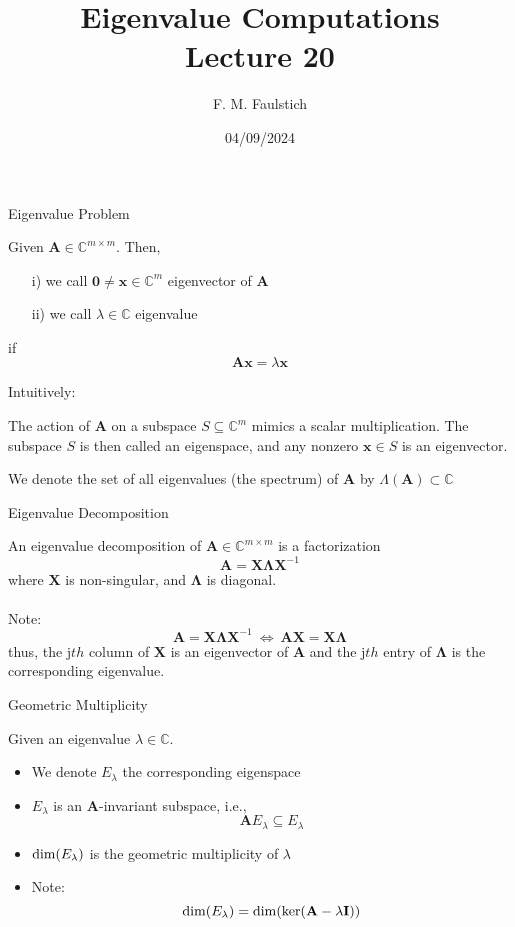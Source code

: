 \documentclass{beamer}
\title{
Eigenvalue Computations\\
Lecture 20
}
\author{F. M. Faulstich}
\date{04/09/2024}
\newcommand{\bgk}[1]{\boldsymbol{#1}}
\newcommand{\bzero}{\bgk{0}}
\newcommand{\bLambda}{\bgk{\Lambda}}
\newcommand{\bvec}[1]{\mathbf{#1}}
\newcommand{\vx}{\bvec{x}}
\newcommand{\vA}{\bvec{A}}
\newcommand{\vI}{\bvec{I}}
\newcommand{\vX}{\bvec{X}}
\newcommand{\bitem}{\item[$\bullet$]}
\begin{document}
\frame{\titlepage}

\begin{frame}{Eigenvalue Problem}

Given $\vA \in\mathbb{C}^{m\times m}$. Then,
\begin{itemize}
    \item[i)] we call $\bzero \neq \vx \in\mathbb{C}^m$ eigenvector of $\vA$
    \item[ii)] we call $\lambda \in \mathbb{C}$ eigenvalue
\end{itemize}
if
$$
\vA \vx = \lambda \vx
$$

Intuitively:\\ 
\pause
\begin{center}
The action of $\vA$ on a subspace $S\subseteq \mathbb{C}^m$ mimics a scalar multiplication. The subspace $S$ is then called an eigenspace, and any nonzero $\vx\in S$ is an eigenvector.
\end{center}

We denote the set of all eigenvalues (the spectrum) of $\vA$ by $\Lambda(\vA) \subset \mathbb{C}$

\end{frame}


\begin{frame}{Eigenvalue Decomposition}

\pause
An eigenvalue decomposition of $\vA \in\mathbb{C}^{m\times m}$ is a factorization
$$
\vA = \vX \bLambda \vX^{-1}
$$
where $\vX$ is non-singular, and $\bLambda$ is diagonal.\\
~\\
\pause
Note:
$$
\vA = \vX \bLambda \vX^{-1}
~\Leftrightarrow~
\vA\vX = \vX \bLambda 
$$
thus, the j$th$ column of $\vX$ is an eigenvector of
$\vA$ and the j$th$ entry of $\bLambda$ is the corresponding eigenvalue.

\end{frame}


\begin{frame}{Geometric Multiplicity}

Given an eigenvalue $\lambda \in \mathbb{C}$. \\
\begin{itemize}
    \bitem We denote $E_\lambda$ the corresponding eigenspace
    \bitem $E_\lambda$ is an $\vA$-invariant subspace, i.e.,
    $$
    \vA E_\lambda \subseteq E_\lambda
    $$
    \bitem ${\rm dim}(E_\lambda)$ is the geometric multiplicity of $\lambda$
    \bitem Note:
    $$
    {\rm dim}(E_\lambda) = {\rm dim}({\rm ker}(\vA - \lambda \vI))
    $$
\end{itemize}

\end{frame}
\end{document}
